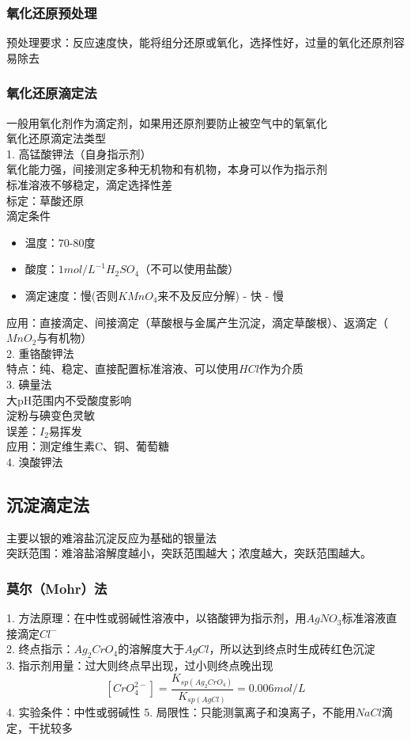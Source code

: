 \documentclass[utf8,a4paper,12pt]{ctexart}
\begin{document}
\subsubsection{氧化还原预处理}
预处理要求：反应速度快，能将组分还原或氧化，选择性好，过量的氧化还原剂容易除去\\
\subsubsection{氧化还原滴定法}
一般用氧化剂作为滴定剂，如果用还原剂要防止被空气中的氧氧化\\
氧化还原滴定法类型\\
1. 高锰酸钾法（自身指示剂）\\
\quad 氧化能力强，间接测定多种无机物和有机物，本身可以作为指示剂\\
\quad 标准溶液不够稳定，滴定选择性差\\
标定：草酸还原\\
滴定条件
\begin{itemize}
\item 温度：70-80度
\item 酸度：$1mol/L^{-1}H_2SO_4$（不可以使用盐酸）
\item 滴定速度：慢(否则$KMnO_4$来不及反应分解) - 快 - 慢
\end{itemize}
应用：直接滴定、间接滴定（草酸根与金属产生沉淀，滴定草酸根）、返滴定（$MnO_2$与有机物）\\
2. 重铬酸钾法\\
特点：纯、稳定、直接配置标准溶液、可以使用$HCl$作为介质\\
3. 碘量法\\
大pH范围内不受酸度影响\\
淀粉与碘变色灵敏\\
误差：$I_2$易挥发\\
应用：测定维生素C、铜、葡萄糖\\
4. 溴酸钾法\\

\subsection{沉淀滴定法}
主要以银的难溶盐沉淀反应为基础的银量法\\
突跃范围：难溶盐溶解度越小，突跃范围越大；浓度越大，突跃范围越大。\\
\subsubsection{莫尔（Mohr）法}
1. 方法原理：在中性或弱碱性溶液中，以铬酸钾为指示剂，用$AgNO_3$标准溶液直接滴定$Cl^-$\\
2. 终点指示：$Ag_2CrO_4$的溶解度大于$AgCl$，所以达到终点时生成砖红色沉淀\\
3. 指示剂用量：过大则终点早出现，过小则终点晚出现
\[[CrO_4^{2-}] = \frac{K_{sp(Ag_2CrO_4)}}{K_{sp(AgCl)}} = 0.006mol/L\]
4. 实验条件：中性或弱碱性
5. 局限性：只能测氯离子和溴离子，不能用$NaCl$滴定，干扰较多
\end{document}
